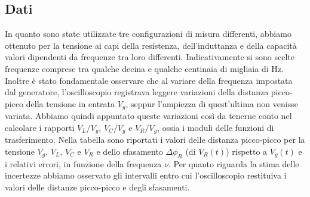 \documentclass[a4paper]{article}
\begin{document}
\subsection{Dati}
In quanto sono state utilizzate tre configurazioni di misura differenti, abbiamo ottenuto per la tensione ai capi della resistenza, dell'induttanza e della capacità valori dipendenti da frequenze tra loro differenti. Indicativamente si sono scelte frequenze comprese tra qualche decina e qualche centinaia di migliaia di \si{\hertz}. Inoltre è stato fondamentale osservare che al variare della frequenza impostata dal generatore, l'oscilloscopio registrava leggere variazioni della distanza picco-picco della tensione in entrata $V_g$, seppur l'ampiezza di quest'ultima non venisse variata. Abbiamo quindi appuntato queste variazioni così da tenerne conto nel calcolare i rapporti $V_L/V_g$, $V_C/V_g$ e $V_R/V_g$, ossia i moduli delle funzioni di trasferimento. Nella tabella sono riportati i valori delle distanza picco-picco per la tensione $V_g$, $V_L$, $V_C$ e $V_R$ e dello sfasamento $\Delta\phi_R$ (di $V_R(t)$) rispetto a $V_g(t)$ e i relativi errori, in funzione della frequenza $\nu$. Per quanto riguarda la stima delle incertezze abbiamo osservato gli intervalli entro cui l'oscilloscopio restituiva i valori delle distanze picco-picco e degli sfasamenti.
\end{document}
